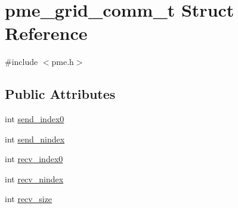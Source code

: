 \hypertarget{structpme__grid__comm__t}{\section{pme\-\_\-grid\-\_\-comm\-\_\-t \-Struct \-Reference}
\label{structpme__grid__comm__t}
}


{\ttfamily \#include $<$pme.\-h$>$}

\subsection*{\-Public \-Attributes}
\begin{DoxyCompactItemize}
\item 
int \hyperlink{structpme__grid__comm__t_acf453fe3604e685448fd03f919c75a44}{send\-\_\-index0}
\item 
int \hyperlink{structpme__grid__comm__t_a3ad105ea25033c0e636b1461685f8e6a}{send\-\_\-nindex}
\item 
int \hyperlink{structpme__grid__comm__t_a83855c7fd8f1e558a04dbf212a58b266}{recv\-\_\-index0}
\item 
int \hyperlink{structpme__grid__comm__t_ab9a8dfc242e59f539a584e2d9d55dca6}{recv\-\_\-nindex}
\item 
int \hyperlink{structpme__grid__comm__t_ae7a7f8eb559bf08cf5154a48583bfeaf}{recv\-\_\-size}
\end{DoxyCompactItemize}


